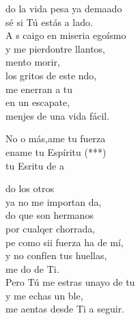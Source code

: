 \begin{cancion}%
	do la vida pesa ya demaado\\
	 sé si Tú estás a  lado.\\
	A s caigo en  miseria egoísmo\\
	y me pierdontre llantos, \\
	mento morir,\\
	los gritos de este ndo,\\
	me enerran a tu \\
	en un escapate, \\
	menjes de una vida fácil.\jump\\
	\begin{chorus}%
		No o más,ame tu fuerza\\
		ename tu Espíritu (***) \\
		tu Esritu de a \jump\\
	\end{chorus}%
	do los otros\\
	ya no me importan da,\\
	do que son hermanos \\
	por cualqer chorrada,\\
	pe como sii fuerza ha de mí,\\
	y no confíen tus huellas,  \\
	me do de Ti.\\
	Pero Tú me estras unayo de tu\\
	y me echas un ble, \\
	me aentas desde Ti a seguir.\\
\end{cancion}%
